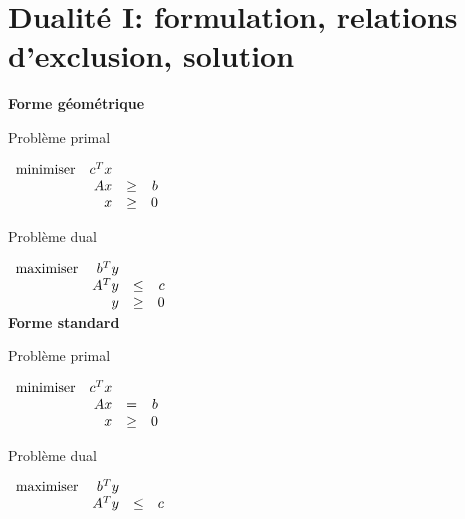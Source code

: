 \section{Dualité I: formulation, relations d'exclusion, solution}


{\bf Forme géométrique}

Problème primal

$
\begin{array}{lrcr}
  \mbox{minimiser} & c^T x\\
  & A x & \geq &  b\\
  & x   & \geq & 0
\end{array}
$

Problème dual

$
\begin{array}{lrcr}
  \mbox{maximiser} & b^Ty\\
  & A^T y & \leq &  c\\
  & y   & \geq & 0
\end{array}
$\\


{\bf Forme standard}



Problème primal

$
\begin{array}{lrcr}
  \mbox{minimiser} & c^T x\\
  & A x & = &  b\\
  & x   & \geq & 0
\end{array}
$



Problème dual


$
\begin{array}{lrcr}
  \mbox{maximiser} & b^T y\\
  & A^T y & \leq &  c
\end{array}
$


\newpage




